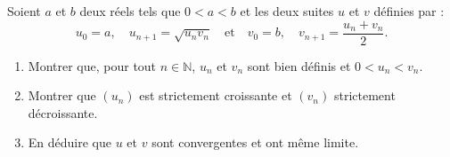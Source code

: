 \documentclass[]{exercices}
\begin{document}
\begin{exercice}[\di]
	Soient $a$ et $b$ deux réels tels que $0 < a < b$ et les deux suites $u$ et $v$ définies par :
	\[ u_0 = a, \quad u_{n+1} = \sqrt{u_n v_n} \quad \text{et} \quad v_0 = b, \quad v_{n+1} = \frac{u_n + v_n}{2}. \]
	\begin{enumerate}
		\item Montrer que, pour tout $n \in \mathbb N$, $u_n$ et $v_n$ sont bien définis et $0<u_n < v_n$.
		\item Montrer que $(u_n)$ est strictement croissante et $(v_n)$ strictement décroissante.
		\item En déduire que $u$ et $v$ sont convergentes et ont même limite.
	\end{enumerate}
\end{exercice}
\end{document}
